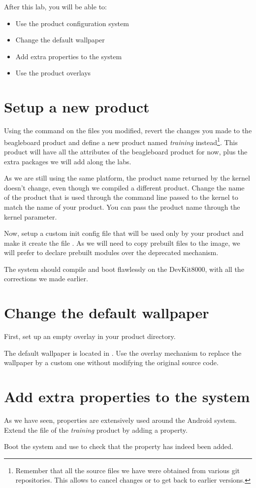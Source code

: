 
After this lab, you will be able to:
\begin{itemize}
  \item Use the product configuration system
  \item Change the default wallpaper
  \item Add extra properties to the system
  \item Use the product overlays
\end{itemize}

\section{Setup a new product}

Using the  command on the files you modified,
revert the changes you made to the beagleboard product and define
a new product named \textit{training} instead\footnote{Remember
that all the source files we have were obtained from various git
repositories. This allows to cancel changes or to get back to
earlier versions.}.  This product will have all the
attributes of the beagleboard product for now, plus the extra packages
we will add along the labs.

As we are still using the same platform, the product name returned by the
kernel doesn't change, even though we compiled a different product. Change
the name of the product that is used through the command line passed to the
kernel to match the name of your product. You can pass the product name through
the  kernel parameter.

Now, setup a custom init config file that will be used only by your
product and make it create the file . As we
will need to copy prebuilt files to the image, we will prefer to
declare prebuilt modules over the deprecated 
mechanism.

The system should compile and boot flawlessly on the DevKit8000, with all the
corrections we made earlier.

\section{Change the default wallpaper}

First, set up an empty overlay in your product directory.

The default wallpaper is located in .
Use the overlay mechanism to replace the wallpaper by a custom one without
modifying the original source code.

\section{Add extra properties to the system}

As we have seen, properties are extensively used around the Android system.
Extend the  file of the \textit{training} product by adding a
 property.

Boot the system and use  to check that the property has indeed been added.
